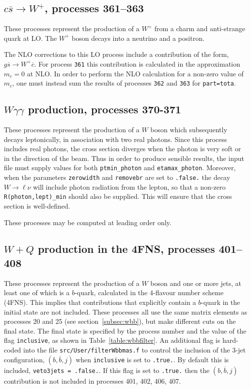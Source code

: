 \documentclass{article}
\begin{document}
{{{{{{\subsection{$c \overline s \to W^+$, processes 361--363}
\label{subsec:csbar}
These processes represent the production of a $W^+$ from a charm and anti-strange
quark at LO. The $W^+$ boson decays into a neutrino and a positron.

The NLO corrections to this LO process include a contribution of the form,
$g\overline s \to W^+ \overline c$. For process {\tt 361} this contribution is
calculated in the approximation $m_c=0$ at NLO. In order to perform the NLO calculation 
for a non-zero value of $m_c$, one must instead sum the results of processes {\tt 362}
and {\tt 363} for {\tt part=tota}.

\subsection{$W\gamma\gamma$ production, processes 370-371}
\label{subsec:wgamgam}

These processes represent the production of a $W$ boson which subsequently
decays leptonically, in association with two real photons.
Since this process includes real photons, the cross section diverges
when the photon is very soft or in the direction of the beam.
Thus in order to produce sensible results, the input file must supply values for both
{\tt ptmin\_photon} and {\tt etamax\_photon}. Moreover, when the parameters {\tt zerowidth}
and {\tt removebr} are set to {\tt .false.} the decay $W \to \ell \nu$ will include
photon radiation from the lepton, so that a non-zero {\tt R(photon,lept)\_min} should
also be supplied. This will ensure that the cross section is well-defined.

These processes may be computed at leading order only.

\subsection{$W+Q$ production in the 4FNS, processes 401--408}
\label{subsec:wbbfilter}
These processes represent the production of a $W$ boson and one or more jets,
at least one of which is a $b$-quark, calculated in the 4-flavour number scheme (4FNS). 
This implies that contributions that explicitly contain a $b$-quark in the initial state
are not included.
These processes all use the same matrix
elements as processes 20 and 25 (see section~\ref{subsec:wbb}), but make different
cuts on the final state. The final state is specified by the process number and
the value of the flag {\tt inclusive}, as shown in Table~\ref{table:wbbfilter}.
An additional flag is hard-coded into the file {\tt src/User/filterWbbmas.f} to control
the inclusion of the 3-jet configuration, $(b,\overline b,j)$ when {\tt inclusive} is set to {\tt .true.}.
By default this is included, {\tt veto3jets = .false.}. If this flag is set to {\tt .true.} 
then the $(b,\overline b,j)$ contribution
is not included in processes 401, 402, 406, 407.

}}}}}}
\end{document}
